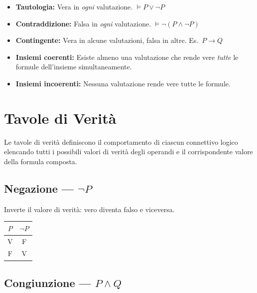 \documentclass[10pt,a4paper]{article}
\newcommand{\entails}{\vDash}
\begin{document}
\begin{definizione}
\begin{itemize}[leftmargin=*, itemsep=1pt, topsep=0pt]
  \item \textbf{Tautologia:} Vera in \emph{ogni} valutazione.
    $\entails P \lor \lnot P$
  \item \textbf{Contraddizione:} Falsa in \emph{ogni} valutazione.
    $\entails \lnot(P \land \lnot P)$
  \item \textbf{Contingente:} Vera in alcune valutazioni, falsa in altre.
    Es.\ $P \to Q$
  \item \textbf{Insiemi coerenti:} Esiste almeno una valutazione che
    rende vere \emph{tutte} le formule dell'insieme simultaneamente.
  \item \textbf{Insiemi incoerenti:} Nessuna valutazione rende vere
    tutte le formule.
\end{itemize}
\end{definizione}


\newpage
\section{Tavole di Verità}

Le tavole di verità definiscono il comportamento di ciascun connettivo logico
elencando tutti i possibili valori di verità degli operandi e il
corrispondente valore della formula composta.

\subsection{Negazione --- $\lnot P$}

Inverte il valore di verità: vero diventa falso e viceversa.

\begin{center}
\renewcommand{\arraystretch}{1.3}
\begin{tabular}{c|c}
  \toprule
  $P$ & $\lnot P$ \\
  \midrule
  V & F \\
  F & V \\
  \bottomrule
\end{tabular}
\end{center}

\subsection{Congiunzione --- $P \land Q$}
\end{document}

